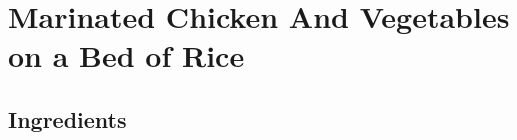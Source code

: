 \thispagestyle{fancy}
\section{Marinated Chicken And Vegetables on a Bed of Rice}
\AddToShipoutPicture*{\MarinatedChickenAndRice}

\subsection*{Ingredients}